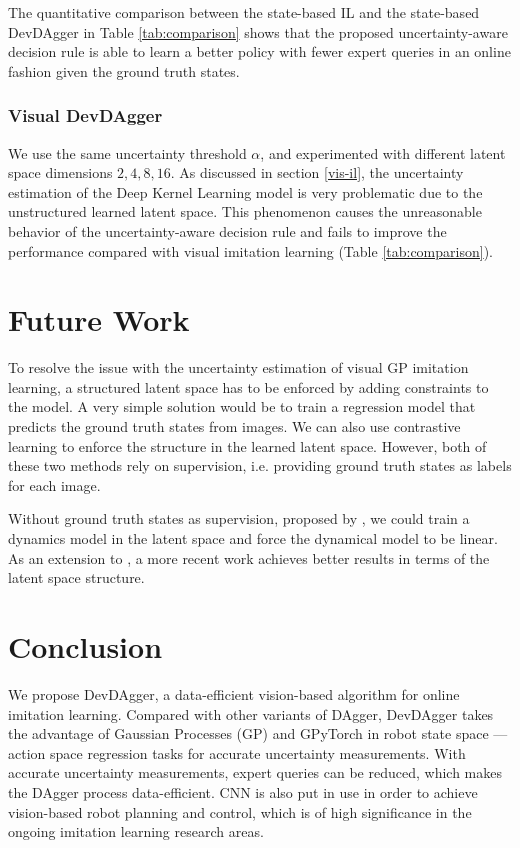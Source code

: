\documentclass[11pt, reqno, letterpaper, twoside]{amsart}
\begin{document}
The quantitative comparison between the state-based IL and the state-based
DevDAgger in Table \ref{tab:comparison} shows that the proposed
uncertainty-aware decision rule is able to learn a better policy with fewer
expert queries in an online fashion given the ground truth states.

\subsubsection{Visual DevDAgger}
We use the same uncertainty threshold $\alpha$, and experimented with different
latent space dimensions $2, 4, 8, 16$. As discussed in section \ref{vis-il}, the
uncertainty estimation of the Deep Kernel Learning model is very problematic due
to the unstructured learned latent space. This phenomenon causes the
unreasonable behavior of the uncertainty-aware decision rule and fails to
improve the performance compared with visual imitation learning (Table
\ref{tab:comparison}).

\section{Future Work}
To resolve the issue with the uncertainty estimation of visual GP imitation
learning, a structured latent space has to be enforced by adding constraints to
the model. A very simple solution would be to train a regression model that
predicts the ground truth states from images. We can also use contrastive
learning to enforce the structure in the learned latent space. However, both of
these two methods rely on supervision, i.e. providing ground truth states as
labels for each image.

Without ground truth states as supervision, proposed by \cite{watter2015embed},
we could train a dynamics model in the latent space and force the dynamical
model to be linear. As an extension to \cite{watter2015embed}, a more recent
work \cite{levine2019prediction} achieves better results in terms of the latent
space structure.

\section{Conclusion}
We propose DevDAgger, a data-efficient vision-based algorithm for online
imitation learning. Compared with other variants of DAgger, DevDAgger takes the
advantage of Gaussian Processes (GP) and GPyTorch \cite{GPyTorch} in robot state
space --- action space regression tasks for accurate uncertainty measurements.
With accurate uncertainty measurements, expert queries can be reduced, which
makes the DAgger process data-efficient. CNN is also put in use in order to
achieve vision-based robot planning and control, which is of high significance
in the ongoing imitation learning research areas.
\end{document}
